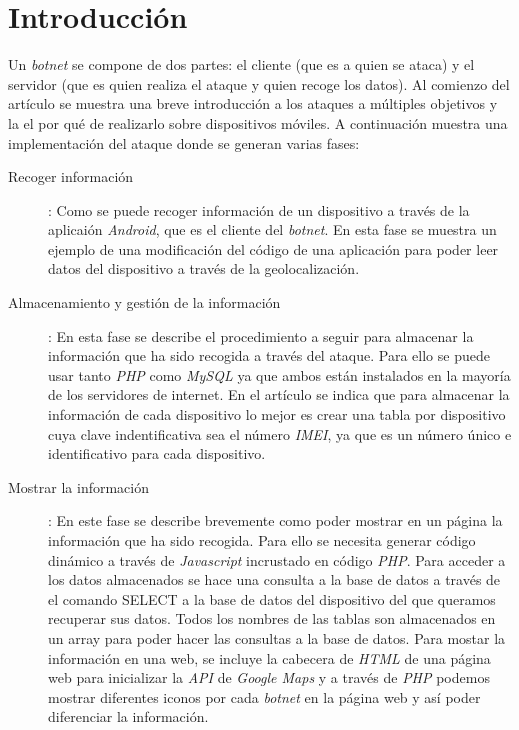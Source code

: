 \documentclass[a4paper,11pt]{report}
\begin{document}
\chapter{Introducción}

 Un \emph{botnet} se compone de dos partes: el cliente (que es a quien se ataca) y el servidor (que es quien realiza el ataque y quien recoge los datos). Al comienzo del artículo se muestra una breve introducción a los ataques a múltiples objetivos y la el por qué de realizarlo sobre dispositivos móviles. A continuación muestra una implementación del ataque donde se generan varias fases: 

\begin{description}
\item [Recoger información]: Como se puede recoger información de un dispositivo a través de la aplicaión \emph{Android}, que es el cliente del \emph{botnet}. En esta fase se muestra un ejemplo de una modificación del código de una aplicación para poder leer datos del dispositivo a través de la geolocalización.

\item [Almacenamiento y gestión de la información]: En esta fase se describe el procedimiento a seguir para almacenar la información que ha sido recogida a través del ataque. Para ello se puede usar tanto \emph{PHP} como \emph{MySQL} ya que ambos están instalados en la mayoría de los servidores de internet. En el artículo se indica que para almacenar la información de cada dispositivo lo mejor es crear una tabla por dispositivo cuya clave indentificativa sea el número \emph{IMEI}, ya que es un número único e identificativo para cada dispositivo.

\item [Mostrar la información]: En este fase se describe brevemente como poder mostrar en un página la información que ha sido recogida. Para ello se necesita generar código dinámico a través de \emph{Javascript} incrustado en código \emph{PHP}. Para acceder a los datos almacenados se hace una consulta a la base de datos a través de el comando SELECT a la base de datos del dispositivo del que queramos recuperar sus datos. Todos los nombres de las tablas son almacenados en un array para poder hacer las consultas a la base de datos. Para mostar la información en una web, se incluye la cabecera de \emph{HTML} de una página web para inicializar la \emph{API} de \emph{Google Maps} y a través de \emph{PHP} podemos mostrar diferentes iconos por cada \emph{botnet} en la página web y así poder diferenciar la información.


\end{description}
\end{document}
